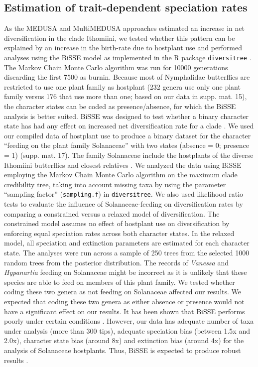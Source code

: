 \documentclass[10pt]{article}
\begin{document}
\subsection*{Estimation of trait-dependent speciation
rates}

As the MEDUSA and MultiMEDUSA approaches estimated an increase in net
diversification in the clade Ithomiini, we tested whether this pattern
can be explained by an increase in the birth-rate due to hostplant use
and performed analyses using the BiSSE model \cite{maddison2007} 
as implemented in the R package
\texttt{diversitree} \cite{fitzjohn2012}. The Markov Chain Monte Carlo algorithm
was run for 10000 generations discarding the first 7500 as burnin.
Because most of Nymphalidae butterflies are restricted to
use one plant family as hostplant (232 genera use only one plant family
versus 176 that use more than one; based on our data in supp. mat. 15),
the character states can be coded as presence/absence, for which the
BiSSE analysis is better suited. BiSSE was designed to test whether a
binary character state has had any effect on increased net
diversification rate for a clade \cite{maddison2007}. We used our compiled data of
hostplant use to produce a binary dataset for the character ``feeding on
the plant family Solanaceae'' with two states (absence = 0; presence =
1) (supp. mat. 17). The family Solanaceae include the hostplants of the
diverse Ithomiini butterflies and closest relatives \cite{willmott2006}. 
We analyzed the data using BiSSE employing the Markov Chain
Monte Carlo algorithm on the maximum clade credibility tree, taking into
account missing taxa by using the parameter ``sampling factor''
(\texttt{sampling.f}) in \texttt{diversitree}. 
We also used likelihood ratio tests to evaluate the influence of
Solanaceae-feeding on diversification rates by comparing a constrained versus
a relaxed model of diversification.
The constrained model assumes no effect of hostplant use on diversification by
enforcing equal speciation rates across both character states. In the relaxed
model, all speciation and extinction parameters are estimated for each
character state.
The analyses were run across a sample of 250
trees from the selected 1000 random trees from the posterior
distribution. The records of \emph{Vanessa} and \emph{Hypanartia}
feeding on Solanaceae \cite{beccaloni2008, scott1986} might be incorrect as it is unlikely
that these species are able to feed on members of this plant family. We tested
whether coding these two genera as not feeding on Solanaceae affected
our results. We expected that coding these two genera as either absence
or presence would not have a significant effect on our results. It has
been shown that BiSSE performs poorly under certain conditions \cite{davis2013}.
However, our data has adequate number of taxa under analysis (more than
300 tips), adequate speciation bias (between 1.5x and 2.0x), character
state bias (around 8x) and extinction bias (around 4x) for the analysis
of Solanaceae hostplants. Thus, BiSSE is expected to produce robust
results \cite{davis2013}.
\end{document}
